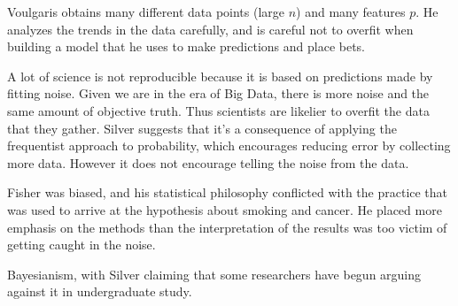 \documentclass[12pt]{article}
\begin{document}
\begin{enumerate}

Voulgaris obtains many different data points (large $n$) and many features $p$.
He analyzes the trends in the data carefully, and is careful not to overfit
when building a model that he uses to make predictions and place bets.


A lot of science is not reproducible because it is based on predictions
made by fitting noise. Given we are in the era of Big Data, there is more
noise and the same amount of objective truth. Thus scientists are likelier
to overfit the data that they gather. Silver suggests that it's a consequence
of applying the frequentist approach to probability, which encourages reducing
error by collecting more data. However it does not encourage telling the
noise from the data.


Fisher was biased, and his statistical philosophy conflicted with the practice
that was used to arrive at the hypothesis about smoking and cancer. He placed
more emphasis on the methods than the interpretation of the results was too
victim of getting caught in the noise.


Bayesianism, with Silver claiming that some researchers have begun arguing
against it in undergraduate study.







\end{enumerate}
\end{document}
